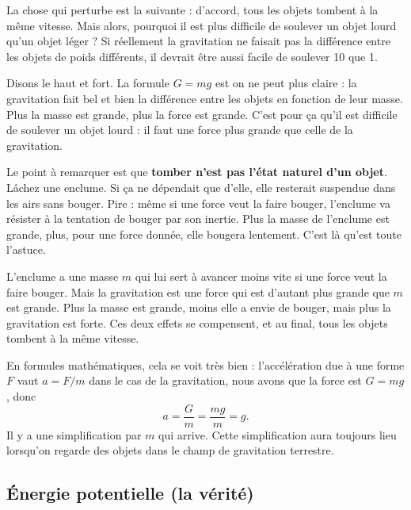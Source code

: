 La chose qui perturbe est la suivante : d'accord, tous les objets tombent à la même vitesse. Mais alors, pourquoi il est plus difficile de soulever un objet lourd qu'un objet léger ? Si réellement la gravitation ne faisait pas la différence entre les objets de poids différents, il devrait être aussi facile de soulever \unit{10}{\kilo\gram} que \unit{1}{\kilo\gram}.

Disons le haut et fort. La formule $G=mg$ est on ne peut plus claire : la gravitation fait bel et bien la différence entre les objets en fonction de leur masse. Plus la masse est grande, plus la force est grande. C'est pour ça qu'il est difficile de soulever un objet lourd : il faut une force plus grande que celle de la gravitation.

Le point à remarquer est que {\bf tomber n'est pas l'état \og naturel\fg{} d'un objet}. Lâchez une enclume. Si ça ne dépendait que d'elle, elle resterait suspendue dans les airs sans bouger. Pire : même si une force veut la faire bouger, l'enclume va résister à la tentation de bouger par son inertie. Plus la masse de l'enclume est grande, plus, pour une force donnée, elle bougera lentement. C'est là qu'est toute l'astuce.

L'enclume a une masse $m$ qui lui sert à avancer moins vite si une force veut la faire bouger. Mais la gravitation est une force qui est d'autant plus grande que $m$ est grande. Plus la masse est grande, moins elle a envie de bouger, mais plus la gravitation est forte. Ces deux effets se compensent, et au final, tous les objets tombent à la même vitesse.

En formules mathématiques, cela se voit très bien : l'accélération due à une forme $F$ vaut $a=F/m$ dans le cas de la gravitation, nous avons que la force est $G=mg$, donc
\begin{equation}
	a=\frac{ G }{ m }=\frac{ mg }{ m }=g.
\end{equation}
Il y a une simplification par $m$ qui arrive. Cette simplification aura toujours lieu lorsqu'on regarde des objets dans le champ de gravitation terrestre.


\subsection{Énergie potentielle (la vérité)}

